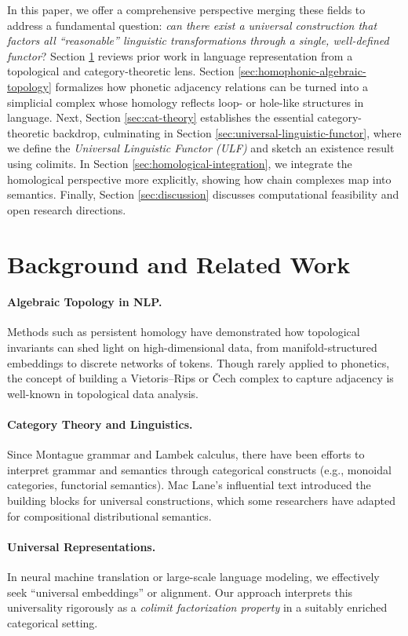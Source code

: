 \documentclass[11pt]{article}
\theoremstyle{definition}
\theoremstyle{remark}
\begin{document}
In this paper, we offer a comprehensive perspective merging these fields to address a fundamental question: \emph{can there exist a universal construction that factors all “reasonable” linguistic transformations through a single, well-defined functor}? Section \ref{sec:background} reviews prior work in language representation from a topological and category-theoretic lens. Section \ref{sec:homophonic-algebraic-topology} formalizes how phonetic adjacency relations can be turned into a simplicial complex whose homology reflects loop- or hole-like structures in language. Next, Section \ref{sec:cat-theory} establishes the essential category-theoretic backdrop, culminating in Section \ref{sec:universal-linguistic-functor}, where we define the \emph{Universal Linguistic Functor (ULF)} and sketch an existence result using colimits. In Section \ref{sec:homological-integration}, we integrate the homological perspective more explicitly, showing how chain complexes map into semantics. Finally, Section \ref{sec:discussion} discusses computational feasibility and open research directions.

\section{Background and Related Work}
\label{sec:background}
\paragraph{Algebraic Topology in NLP.} Methods such as persistent homology \cite{Zomorodian2005,Ghrist2008} have demonstrated how topological invariants can shed light on high-dimensional data, from manifold-structured embeddings to discrete networks of tokens. Though rarely applied to phonetics, the concept of building a Vietoris–Rips or Čech complex to capture adjacency is well-known in topological data analysis.

\paragraph{Category Theory and Linguistics.} Since Montague grammar and Lambek calculus, there have been efforts to interpret grammar and semantics through categorical constructs (e.g., monoidal categories, functorial semantics). Mac Lane’s influential text \cite{MacLane1978} introduced the building blocks for universal constructions, which some researchers have adapted for compositional distributional semantics.

\paragraph{Universal Representations.} In neural machine translation or large-scale language modeling, we effectively seek “universal embeddings” or alignment. Our approach interprets this universality rigorously as a \emph{colimit factorization property} in a suitably enriched categorical setting.
\end{document}
